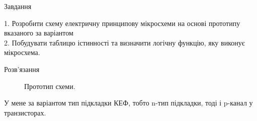 \documentclass[a4paper,14pt]{extreport}
\begin{document}
\begin{center}Завдання\\ \end{center}
1. Розробити схему електричну принципову мікросхеми на основі прототипу вказаного за варіантом\\

2. Побудувати таблицю істинності та визначити логічну функцію, яку виконує мікросхема.


\begin{center}Розв’язання\\ \end{center}

\begin{figure}[h!]
\caption{Прототип схеми.}
\label{ris1}
\end{figure}
У мене за варіантом тип підкладки КЕФ, тобто n-тип підкладки, тоді і p-канал у транзисторах.\\
\end{document}
